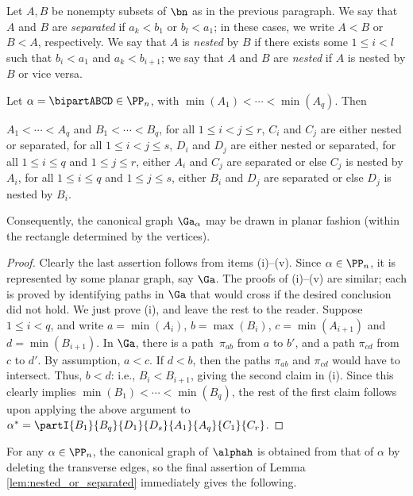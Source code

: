Let $A,B$ be nonempty subsets of $\bn$ as in the previous paragraph.  We say that $A$ and $B$ are \emph{separated} if $a_k<b_1$ or $b_l<a_1$; in these cases, we write $A<B$ or $B<A$, respectively.  We say that $A$ is \emph{nested} by $B$ if there exists some $1\leq i<l$ such that $b_i<a_1$ and $a_k<b_{i+1}$; we say that $A$ and $B$ are \emph{nested} if $A$ is nested by $B$ or vice versa.


\begin{lemma}\label{lem:nested_or_separated}
Let $\alpha=\bipartABCD\in\PP_n$, with $\min(A_1)<\cdots<\min(A_q)$.  Then
\begin{itemize}
 $A_1<\cdots<A_q$ and $B_1<\cdots<B_q$,
 for all $1\leq i<j\leq r$, $C_i$ and $C_j$ are either nested or separated,
 for all $1\leq i<j\leq s$, $D_i$ and $D_j$ are either nested or separated,
 for all $1\leq i\leq q$ and $1\leq j\leq r$, either $A_i$ and $C_j$ are separated or else $C_j$ is nested by $A_i$,
 for all $1\leq i\leq q$ and $1\leq j\leq s$, either $B_i$ and $D_j$ are separated or else $D_j$ is nested by $B_i$.
\end{itemize}
Consequently, the canonical graph $\Ga_\alpha$ may be drawn in planar fashion (within the rectangle determined by the vertices).
\end{lemma}

\begin{proof} Clearly the last assertion follows from items (i)--(v).  Since $\alpha\in\PP_n$, it is represented by some planar graph, say $\Ga$.
%
The proofs of (i)--(v) are similar; each is proved by identifying paths in
$\Ga$ that would cross if the desired conclusion did not hold.  We just prove
(i), and leave the rest to the reader.  Suppose $1\leq i<q$, and write $a=\min(A_i)$, $b=\max(B_i)$, $c=\min(A_{i+1})$ and $d=\min(B_{i+1})$.  In $\Ga$, there is a path~$\pi_{ab}$ from $a$ to $b'$, and a path $\pi_{cd}$ from $c$ to $d'$.  By assumption, $a<c$.  If $d<b$, then the paths $\pi_{ab}$ and $\pi_{cd}$ would have to intersect.  Thus, $b<d$: i.e., $B_i<B_{i+1}$, giving the second claim in (i).  Since this clearly implies $\min(B_1)<\cdots<\min(B_q)$, the rest of the first claim follows upon applying the above argument to $\alpha^*=\partI{B_1}{B_q}{D_1}{D_s}{A_1}{A_q}{C_1}{C_r}$. \end{proof}

For any $\alpha\in\PP_n$, the canonical graph of $\alphah$ is obtained from that of $\alpha$ by deleting the transverse edges, so the final assertion of Lemma \ref{lem:nested_or_separated} immediately gives the following.


